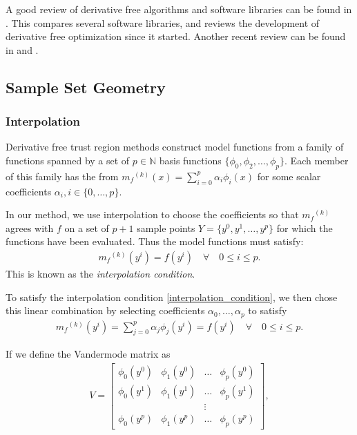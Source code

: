 \documentclass{article}
\theoremstyle{case}
\newcommand{\modelk}{{{m}_f}^{(k)}}
\begin{document}
A good review of derivative free algorithms and software libraries can be found in \cite{DUMMY:review}.
This compares several software libraries, and reviews the development of derivative free optimization since it started.
Another recent review can be found in \cite{DUMMY:review2} and \cite{Larson_2019}.



\subsection{Sample Set Geometry}
\subsubsection{Interpolation}
\label{interpolation}

Derivative free trust region methods construct model functions from a family of functions spanned by a set of $p \in \mathbb N$ basis functions  $\{\phi_0, \phi_2, \ldots, \phi_p\}$.
Each member of this family has the from $\modelk(x) = \sum_{i=0}^p\alpha_i\phi_i(x)$ for some scalar coefficients $\alpha_i, i \in \{0, \ldots, p\}$.

In our method, we use interpolation to choose the coefficients so that $\modelk$ agrees with $f$ on a set of $p+1$ sample points $Y = \{y^0, y^1, \ldots, y^p\}$ for which the functions have been evaluated.
Thus the model functions must satisfy:
\begin{align}
\label{interpolation_condition}
\modelk(y^i) = f(y^i) \quad \forall \quad 0 \le i \le p.
\end{align}
This is known as the \emph{interpolation condition}.

To satisfy the interpolation condition \cref{interpolation_condition}, we then chose this linear combination by selecting coefficients $\alpha_0, \ldots, \alpha_p$ to satisfy
\begin{align}
\label{interpolation_formula}
    \modelk(y^i) = \sum^p_{j=0}\alpha_j\phi_j(y^i) = f(y^i) \quad \forall \quad 0 \le i \le p.
\end{align}

If we define the Vandermode matrix as
\begin{align}
\label{vandermonde}
V=
\begin{bmatrix}
    \phi_0(y^0)      & \phi_1(y^0)       & \ldots & \phi_{p}(y^0)      \\
    \phi_0(y^1)      & \phi_1(y^1)       & \dots  & \phi_{p}(y^1)      \\
                     &                   & \vdots &                    \\
    \phi_0(y^{p})    & \phi_1(y^{p})     & \ldots & \phi_{p}(y^{p})
\end{bmatrix},
\end{align}
\end{document}
